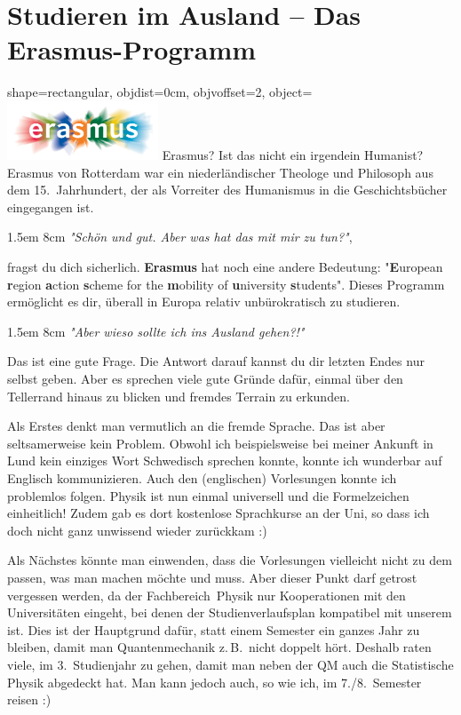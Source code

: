 \enlargethispage{\baselineskip}
\section{Studieren im Ausland -- Das Erasmus-Programm}
\vspace{-0.8\baselineskip}
\begin{pullquote}{shape=rectangular, objdist=0cm, objvoffset=2,
object={\includegraphics[width=4.5cm]{res/erasmus.jpg}}}
Erasmus?
Ist das nicht ein irgendein Humanist?
Erasmus von Rotterdam war ein niederländischer Theologe und Philosoph aus dem 15.~Jahrhundert, der als Vorreiter des Humanismus in die Geschichtsbücher eingegangen ist.

1.5em 8cm
\textit{"Schön und gut.
Aber was hat das mit mir zu tun?"},

fragst du dich sicherlich.
\textbf{Erasmus} hat noch eine andere Bedeutung: "\textbf{E}uropean \textbf{r}egion \textbf{a}ction \textbf{s}cheme for the \textbf{m}obility of \textbf{u}niversity \textbf{s}tudents".
Dieses Programm ermöglicht es dir, überall in Europa relativ unbürokratisch zu studieren.

1.5em 8cm
\textit{"Aber wieso sollte ich ins Ausland gehen?!"}

Das ist eine gute Frage.
Die Antwort darauf kannst du dir letzten Endes nur selbst geben.
Aber es sprechen viele gute Gründe dafür, einmal über den Tellerrand hinaus zu blicken und fremdes Terrain zu erkunden.\pullquotenl

Als Erstes denkt man vermutlich an die fremde Sprache.
Das ist aber seltsamerweise kein Problem.
Obwohl ich beispielsweise bei meiner Ankunft in Lund kein einziges Wort Schwedisch sprechen konnte, konnte ich wunderbar auf Englisch kommunizieren.
Auch den (englischen) Vorlesungen konnte ich problemlos folgen.
Physik ist nun einmal universell und die Formelzeichen einheitlich!
Zudem gab es dort kostenlose Sprachkurse an der Uni, so dass ich doch nicht ganz unwissend wieder zurückkam :)\pullquotenl

Als Nächstes könnte man einwenden, dass die Vorlesungen vielleicht nicht zu dem passen, was man machen möchte und muss.
Aber dieser Punkt darf getrost vergessen werden, da der Fachbereich~Physik nur Kooperationen mit den Universitäten eingeht, bei denen der Studienverlaufsplan kompatibel mit unserem ist.
Dies ist der Hauptgrund dafür, statt einem Semester ein ganzes Jahr zu bleiben, damit man Quantenmechanik z.\,B.\ nicht doppelt hört.
Deshalb raten viele, im 3.~Studienjahr zu gehen, damit man neben der QM auch die Statistische Physik abgedeckt hat.
Man kann jedoch auch, so wie ich, im 7./8.~Semester reisen :)\pullquotenl


\end{pullquote}
